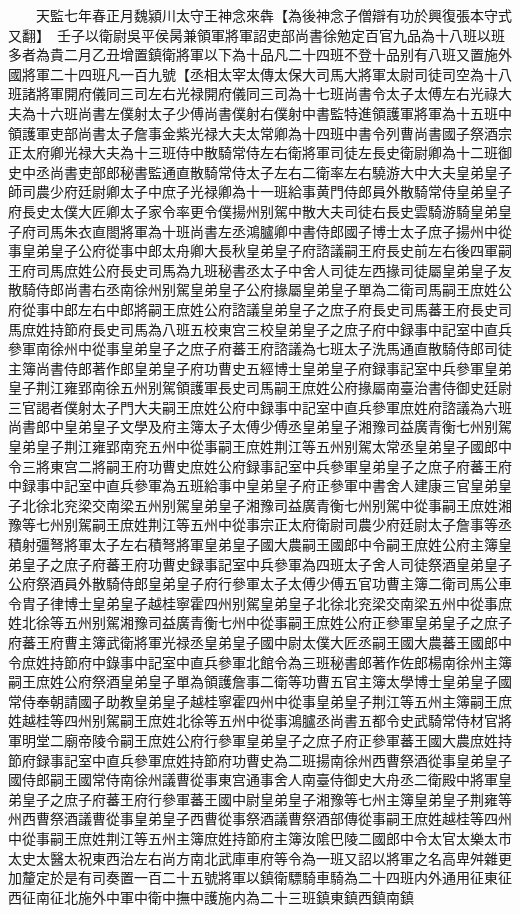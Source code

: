 　　天監七年春正月魏潁川太守王神念來犇【為後神念子僧辯有功於興復張本守式又翻】　壬子以衛尉吳平侯昺兼領軍將軍詔吏部尚書徐勉定百官九品為十八班以班多者為貴二月乙丑增置鎮衛將軍以下為十品凡二十四班不登十品别有八班又置施外國將軍二十四班凡一百九號【丞相太宰太傳太保大司馬大將軍太尉司徒司空為十八班諸將軍開府儀同三司左右光禄開府儀同三司為十七班尚書令太子太傅左右光祿大夫為十六班尚書左僕射太子少傅尚書僕射右僕射中書監特進領護軍將軍為十五班中領護軍吏部尚書太子詹事金紫光禄大夫太常卿為十四班中書令列曹尚書國子祭酒宗正太府卿光禄大夫為十三班侍中散騎常侍左右衛將軍司徒左長史衛尉卿為十二班御史中丞尚書吏部郎秘書監通直散騎常侍太子左右二衛率左右驍游大中大夫皇弟皇子師司農少府廷尉卿太子中庶子光禄卿為十一班給事黄門侍郎員外散騎常侍皇弟皇子府長史太僕大匠卿太子家令率更令僕揚州别駕中散大夫司徒右長史雲騎游騎皇弟皇子府司馬朱衣直閤將軍為十班尚書左丞鴻臚卿中書侍郎國子博士太子庶子揚州中從事皇弟皇子公府從事中郎太舟卿大長秋皇弟皇子府諮議嗣王府長史前左右後四軍嗣王府司馬庶姓公府長史司馬為九班秘書丞太子中舍人司徒左西掾司徒屬皇弟皇子友散騎侍郎尚書右丞南徐州别駕皇弟皇子公府掾屬皇弟皇子單為二衛司馬嗣王庶姓公府從事中郎左右中郎將嗣王庶姓公府諮議皇弟皇子之庶子府長史司馬蕃王府長史司馬庶姓持節府長史司馬為八班五校東宫三校皇弟皇子之庶子府中録事中記室中直兵參軍南徐州中從事皇弟皇子之庶子府蕃王府諮議為七班太子洗馬通直散騎侍郎司徒主簿尚書侍郎著作郎皇弟皇子府功曹史五經博士皇弟皇子府録事記室中兵參軍皇弟皇子荆江雍郢南徐五州别駕領護軍長史司馬嗣王庶姓公府掾屬南臺治書侍御史廷尉三官謁者僕射太子門大夫嗣王庶姓公府中録事中記室中直兵參軍庶姓府諮議為六班尚書郎中皇弟皇子文學及府主簿太子太傅少傅丞皇弟皇子湘豫司益廣青衡七州别駕皇弟皇子荆江雍郢南兖五州中從事嗣王庶姓荆江等五州别駕太常丞皇弟皇子國郎中令三將東宫二將嗣王府功曹史庶姓公府録事記室中兵參軍皇弟皇子之庶子府蕃王府中録事中記室中直兵參軍為五班給事中皇弟皇子府正參軍中書舍人建康三官皇弟皇子北徐北兖梁交南梁五州别駕皇弟皇子湘豫司益廣青衡七州别駕中從事嗣王庶姓湘豫等七州别駕嗣王庶姓荆江等五州中從事宗正太府衛尉司農少府廷尉太子詹事等丞積射彊弩將軍太子左右積弩將軍皇弟皇子國大農嗣王國郎中令嗣王庶姓公府主簿皇弟皇子之庶子府蕃王府功曹史録事記室中兵參軍為四班太子舍人司徒祭酒皇弟皇子公府祭酒員外散騎侍郎皇弟皇子府行參軍太子太傅少傅五官功曹主簿二衛司馬公車令胄子律博士皇弟皇子越桂寧霍四州别駕皇弟皇子北徐北兖梁交南梁五州中從事庶姓北徐等五州别駕湘豫司益廣青衡七州中從事嗣王庶姓公府正參軍皇弟皇子之庶子府蕃王府曹主簿武衛將軍光禄丞皇弟皇子國中尉太僕大匠丞嗣王國大農蕃王國郎中令庶姓持節府中錄事中記室中直兵參軍北館令為三班秘書郎著作佐郎楊南徐州主簿嗣王庶姓公府祭酒皇弟皇子單為領護詹事二衛等功曹五官主簿太學博士皇弟皇子國常侍奉朝請國子助教皇弟皇子越桂寧霍四州中從事皇弟皇子荆江等五州主簿嗣王庶姓越桂等四州别駕嗣王庶姓北徐等五州中從事鴻臚丞尚書五都令史武騎常侍材官將軍明堂二廟帝陵令嗣王庶姓公府行參軍皇弟皇子之庶子府正參軍蕃王國大農庶姓持節府録事記室中直兵參軍庶姓持節府功曹史為二班揚南徐州西曹祭酒從事皇弟皇子國侍郎嗣王國常侍南徐州議曹從事東宫通事舍人南臺侍御史大舟丞二衛殿中將軍皇弟皇子之庶子府蕃王府行參軍蕃王國中尉皇弟皇子湘豫等七州主簿皇弟皇子荆雍等州西曹祭酒議曹從事皇弟皇子西曹從事祭酒議曹祭酒部傳從事嗣王庶姓越桂等四州中從事嗣王庶姓荆江等五州主簿庶姓持節府主簿汝隂巴陵二國郎中令太官太樂太市太史太醫太祝東西治左右尚方南北武庫車府等令為一班又詔以將軍之名高卑舛雜更加釐定於是有司奏置一百二十五號將軍以鎮衛驃騎車騎為二十四班内外通用征東征西征南征北施外中軍中衛中撫中護施内為二十三班鎮東鎮西鎮南鎮